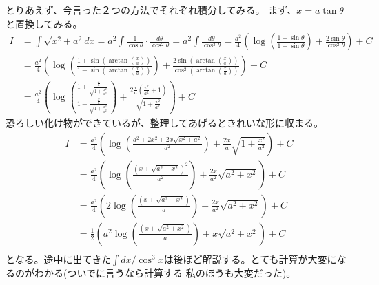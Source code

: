 \documentclass[a4j,dvipdfmx]{jsarticle}
\begin{document}
とりあえず、今言った２つの方法でそれぞれ積分してみる。
\newpage
まず、$x=a\tan\theta$と置換してみる。
\begin{align*}
    I&=\int \sqrt{x^2+a^2}dx=a^2\int \frac{1}{\cos \theta}\cdot\frac{d\theta}{\cos^2 \theta}
    =a^2\int\frac{d\theta}{\cos^3\theta}=\frac{a^2}{4}\left(\log\left(\frac{1+\sin\theta}{1-\sin\theta}\right)
    +\frac{2\sin \theta}{\cos^2 \theta}\right)+C\\
    &=\frac{a^2}{4}\left(\log\left(\frac{1+\sin(\arctan(\frac{x}{a}))}{1-\sin(\arctan(\frac{x}{a}))}\right)
    +\frac{2\sin(\arctan(\frac{x}{a}))}{\cos^2(\arctan(\frac{x}{a}))}\right)+C\\
    &=\frac{a^2}{4}\left(\log\left(\frac{1+\frac{\frac{x}{a}}{\sqrt{1+\frac{x^2}{a^2}}}}{1-\frac{\frac{x}{a}}{\sqrt{1+\frac{x^2}{a^2}}}}\right)
    +\frac{2\frac{x}{a}(\frac{x^2}{a^2}+1)}{\sqrt{1+\frac{x^2}{a^2}}}\right)+C
\end{align*}
恐ろしい化け物ができているが、整理してあげるときれいな形に収まる。
\begin{align*}
    I&=\frac{a^2}{4}\left(\log\left(\frac{a^2+2x^2+2x\sqrt{x^2+a^2}}{a^2}\right)
    +\frac{2x}{a}\sqrt{1+\frac{x^2}{a^2}}\right)+C\\
    &=\frac{a^2}{4}\left(\log\left(\frac{(x+\sqrt{a^2+x^2})^2}{a^2}\right)
    +\frac{2x}{a^2}\sqrt{a^2+x^2}\right)+C\\
    &=\frac{a^2}{4}\left(2\log\left(\frac{(x+\sqrt{a^2+x^2})}{a}\right)
    +\frac{2x}{a^2}\sqrt{a^2+x^2}\right)+C\\
    &=\frac{1}{2}\left(a^2\log\left(\frac{(x+\sqrt{a^2+x^2})}{a}\right)
    +x\sqrt{a^2+x^2}\right)+C\\
\end{align*}
となる。途中に出てきた$\int dx/\cos^3x$は後ほど解説する。とても計算が大変になるのがわかる(ついでに言うなら計算する
私のほうも大変だった)。
\end{document}
